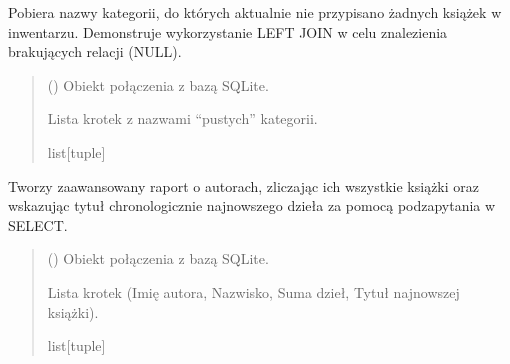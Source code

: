 \documentclass[letterpaper,10pt,english]{sphinxmanual}
\begin{document}
\begin{fulllineitems}
\label{\detokenize{rozdzial_5/index:biblioteka_zapytania.get_puste_kategorie}}
\pysigstartsignatures
\pysiglinewithargsret
{}
{}
{}
\pysigstopsignatures
\sphinxAtStartPar
Pobiera nazwy kategorii, do których aktualnie nie przypisano żadnych książek w inwentarzu.
Demonstruje wykorzystanie LEFT JOIN w celu znalezienia brakujących relacji (NULL).
\begin{quote}\begin{description}
\sphinxAtStartPar
{} () \textendash{} Obiekt połączenia z bazą SQLite.

\sphinxAtStartPar
Lista krotek z nazwami “pustych” kategorii.

\sphinxAtStartPar
list{[}tuple{]}

\end{description}\end{quote}

\end{fulllineitems}


\begin{fulllineitems}
\label{\detokenize{rozdzial_5/index:biblioteka_zapytania.get_raport_autorow}}
\pysigstartsignatures
\pysiglinewithargsret
{}
{}
{}
\pysigstopsignatures
\sphinxAtStartPar
Tworzy zaawansowany raport o autorach, zliczając ich wszystkie książki oraz wskazując 
tytuł chronologicznie najnowszego dzieła za pomocą podzapytania w SELECT.
\begin{quote}\begin{description}
\sphinxAtStartPar
{} () \textendash{} Obiekt połączenia z bazą SQLite.

\sphinxAtStartPar
Lista krotek (Imię autora, Nazwisko, Suma dzieł, Tytuł najnowszej książki).

\sphinxAtStartPar
list{[}tuple{]}

\end{description}\end{quote}

\end{fulllineitems}
\end{document}
